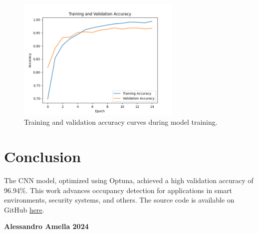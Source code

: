 \documentclass{article}
\begin{document}
\begin{figure}
    \centering
    \includegraphics[width=0.7\textwidth]{accuracy_curves.png}
    \caption{Training and validation accuracy curves during model training.}
    \label{fig:accuracy}
\end{figure}

\section{Conclusion}
The CNN model, optimized using Optuna, achieved a high validation accuracy of 96.94\%. This work advances occupancy detection for applications in smart environments, security systems, and others. The source code is available on GitHub \textcolor{blue}{\href{https://github.com/Bitrey/MLBrno/blob/master/Project/Project.ipynb}{here}}.

\vspace*{\fill}

\hrulefill
\vspace{1em}

\textbf{Alessandro Amella \textcopyright{} 2024}
\end{document}

